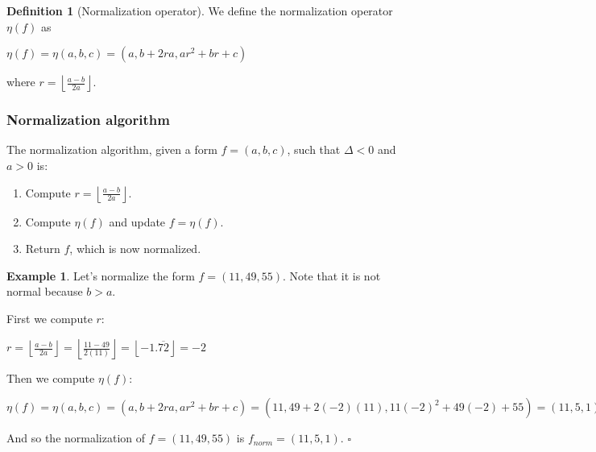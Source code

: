\documentclass{article}
\theoremstyle{definition}
\newtheorem{definition}{Definition}[section]
\theoremstyle{theorem}
\theoremstyle{example}
\newtheorem{example}{Example}[section]
\theoremstyle{corollary}
\begin{document}
\bigskip

\theoremstyle{definition}
\begin{definition}[Normalization operator]
We define the normalization operator \(\eta (f)\) as
\begin{center}
\(\eta (f)  = \eta (a, b, c) = (a, b + 2ra, ar^{2} + br + c)\)
\end{center}
where \(r = \left\lfloor \frac{a-b}{2a} \right\rfloor\).
\end{definition}

\bigskip

\subsubsection{Normalization algorithm}

\bigskip

The normalization algorithm, given a form \(f = (a, b, c)\), such that \(\Delta < 0\) and \(a > 0\) is:
\begin{enumerate}
\item Compute \(r = \left\lfloor \frac{a-b}{2a} \right\rfloor\).
\item Compute \(\eta( f)\) and update \(f = \eta(f)\).
\item Return \(f\), which is now normalized.
\end{enumerate}

\bigskip

\theoremstyle{example}
\begin{example}
Let's normalize the form \(f = (11, 49, 55)\). Note that it is not normal because \(b > a\).

\bigskip

First we compute \(r\):
\begin{center}
\(r = \left\lfloor \frac{a-b}{2a} \right\rfloor = \left\lfloor \frac{11 - 49}{2(11)} \right\rfloor = \left\lfloor -1.\overline{72} \right\rfloor = -2\)
\end{center}

Then we compute \(\eta (f) \):
\begin{center}
\(\eta (f) = \eta (a, b, c) = (a, b + 2ra, ar^{2} + br + c) = (11, 49 + 2(-2)(11), 11(-2)^{2} + 49(-2) + 55) = (11, 5, 1)\)
\end{center}

And so the normalization of \(f = (11, 49, 55) \) is \(f_{norm} = (11, 5, 1)\). \(\square\)
\end{example}

\bigskip
\end{document}
